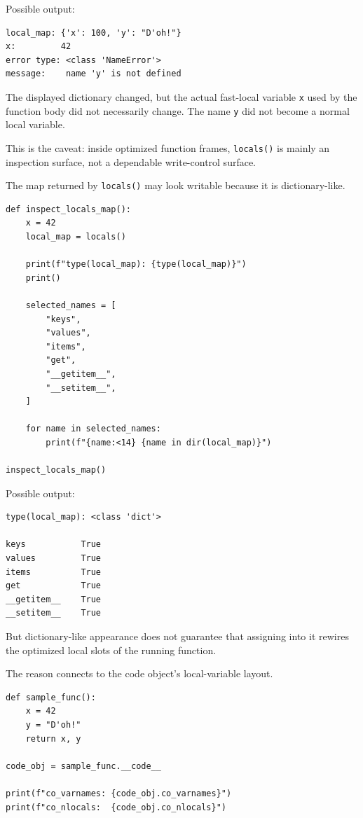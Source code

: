 Possible output:

\begin{verbatim}
local_map: {'x': 100, 'y': "D'oh!"}
x:         42
error type: <class 'NameError'>
message:    name 'y' is not defined
\end{verbatim}

The displayed dictionary changed, but the actual fast-local variable \texttt{x} used by the function body did not necessarily change. The name \texttt{y} did not become a normal local variable.

This is the caveat: inside optimized function frames, \texttt{locals()} is mainly an inspection surface, not a dependable write-control surface.

The map returned by \texttt{locals()} may look writable because it is dictionary-like.

\begin{verbatim}
def inspect_locals_map():
    x = 42
    local_map = locals()

    print(f"type(local_map): {type(local_map)}")
    print()

    selected_names = [
        "keys",
        "values",
        "items",
        "get",
        "__getitem__",
        "__setitem__",
    ]

    for name in selected_names:
        print(f"{name:<14} {name in dir(local_map)}")

inspect_locals_map()
\end{verbatim}

Possible output:

\begin{verbatim}
type(local_map): <class 'dict'>

keys           True
values         True
items          True
get            True
__getitem__    True
__setitem__    True
\end{verbatim}

But dictionary-like appearance does not guarantee that assigning into it rewires the optimized local slots of the running function.

The reason connects to the code object's local-variable layout.

\begin{verbatim}
def sample_func():
    x = 42
    y = "D'oh!"
    return x, y

code_obj = sample_func.__code__

print(f"co_varnames: {code_obj.co_varnames}")
print(f"co_nlocals:  {code_obj.co_nlocals}")
\end{verbatim}

